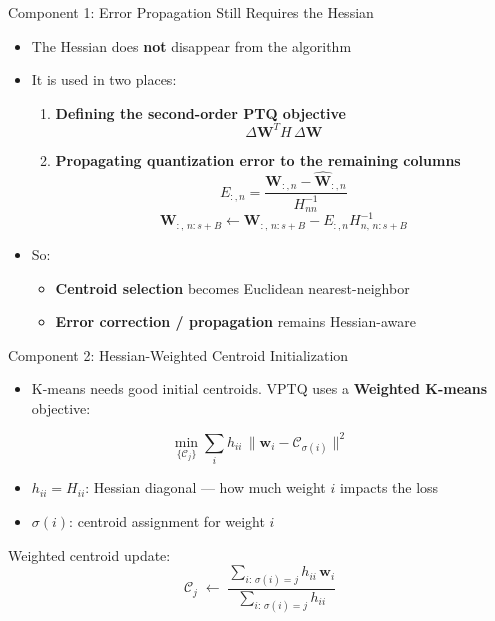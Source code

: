 \begin{frame}{Component 1: Error Propagation Still Requires the Hessian}
   \
  \begin{itemize}
    \item The Hessian does \textbf{not} disappear from the algorithm
    \item It is used in two places:
    \begin{enumerate}
      \item \textbf{Defining the second-order PTQ objective}
      \[
        \Delta \mathbf W^T H\,\Delta \mathbf W
      \]
      \item \textbf{Propagating quantization error to the remaining columns}
      \[
        E_{:,n} = \frac{\mathbf W_{:,n} - \hat{\mathbf W}_{:,n}}{H^{-1}_{nn}}
      \]
      \[
        \mathbf W_{:,\,n:s+B}
        \leftarrow
        \mathbf W_{:,\,n:s+B} - E_{:,n} H^{-1}_{n,\,n:s+B}
      \]
    \end{enumerate}
    \vspace{0.3em}
    \item So:
    \begin{itemize}
      \item \textbf{Centroid selection} becomes Euclidean nearest-neighbor
      \item \textbf{Error correction / propagation} remains Hessian-aware
    \end{itemize}
  \end{itemize}
\end{frame}

\begin{frame}{Component 2: Hessian-Weighted Centroid Initialization}
  \begin{itemize}
    \item K-means needs good initial centroids. VPTQ uses a \textbf{Weighted K-means} objective:
  \end{itemize}
  \[
    \min_{\{\mathcal{C}_j\}} \sum_{i} h_{ii}\,\|\mathbf{w}_i - \mathcal{C}_{\sigma(i)}\|^2
  \]
  \begin{itemize}
    \item $h_{ii} = H_{ii}$: Hessian diagonal --- how much weight $i$ impacts the loss
    \item $\sigma(i)$: centroid assignment for weight $i$
  \end{itemize}
  \vspace{0.2em}
  Weighted centroid update:
  \[
    \mathcal{C}_j \;\leftarrow\; \frac{\displaystyle\sum_{i:\,\sigma(i)=j} h_{ii}\,\mathbf{w}_i}{\displaystyle\sum_{i:\,\sigma(i)=j} h_{ii}}
  \]
 
\end{frame}

